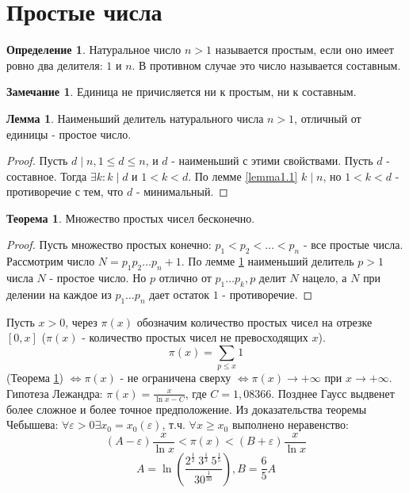 \documentclass[a4paper, 12pt]{article}
\renewcommand{\epsilon}{\varepsilon}
\newcommand{\lra}{\Leftrightarrow}
\renewcommand{\div}{\mid}
\theoremstyle{definition}
\newtheorem{definition}{Определение}[section]
\newtheorem{theorem}{Теорема}[section]
\newtheorem{lemma}{Лемма}[section]
\newtheorem*{comm}{Замечание}
\begin{document}
    \section{Простые числа}
    \begin{definition}
        Натуральное число $n>1$ называется простым, если оно имеет ровно два делителя: $1$ и $n$. В противном случае это число называется составным.
    \end{definition}
    \begin{comm}
        Единица не причисляется ни к простым, ни к составным.
    \end{comm}
    \begin{lemma} \label{lemma5.1}
        Наименьший делитель натурального числа $n>1$, отличный от единицы - простое число.
    \end{lemma} 
    \begin{proof}
        Пусть $d\div n, 1\leq d \leq n$, и $d$ - наименьший с этими свойствами. Пусть $d$ - составное. Тогда $\exists k: k\div d$ и $1<k<d$. По лемме \ref{lemma1.1} $k\div n$, но $1<k<d$ - противоречие с тем, что $d$ - минимальный.
    \end{proof} 
    \begin{theorem} \label{th5.1}
        Множество простых чисел бесконечно.
    \end{theorem}
    \begin{proof}
        Пусть множество простых конечно: $p_1<p_2<\dots<p_n$ - все простые числа. Рассмотрим число $N = p_1p_2\dots p_n+1$. По лемме \ref{lemma5.1} наименьший делитель $p>1$ числа $N$ - простое число. Но $p$ отлично от $p_1\dots p_k, p$ делит $N$ нацело, а $N$ при делении на каждое из $p_1\dots p_n$ дает остаток $1$ - противоречие.
    \end{proof} 
    Пусть $x>0$, через $\pi(x)$ обозначим количество простых чисел на отрезке $[0, x]$ ($\pi(x)$ - количество простых чисел не превосходящих $x$).
    $$\pi(x)=\sum\limits_{p\leq x}1$$
    (Теорема \ref{th5.1}) $\lra \pi(x)$ - не ограничена сверху $\lra \pi(x)\to +\infty$ при $x\to +\infty$.\\
    Гипотеза Лежандра: $\pi(x)=\frac{x}{\ln x-C}$, где $C=1,08366$. Позднее Гаусс выдвенет более сложное и более точное предположение.
    Из доказательства теоремы Чебышева: $\forall \epsilon >0\exists x_0=x_0(\epsilon)$, т.ч. $\forall x\geq x_0$ выполнено неравенство:
    $$(A-\epsilon)\frac{x}{\ln x}<\pi(x)<(B+\epsilon)\frac{x}{\ln x}$$
    $$A=\ln (\frac{2^{\frac{1}{2}} \ 3^{\frac{1}{3}} \ 5^{\frac{1}{5}}}{30^{\frac{1}{30}}}), B=\frac{6}{5}A$$
\end{document}
